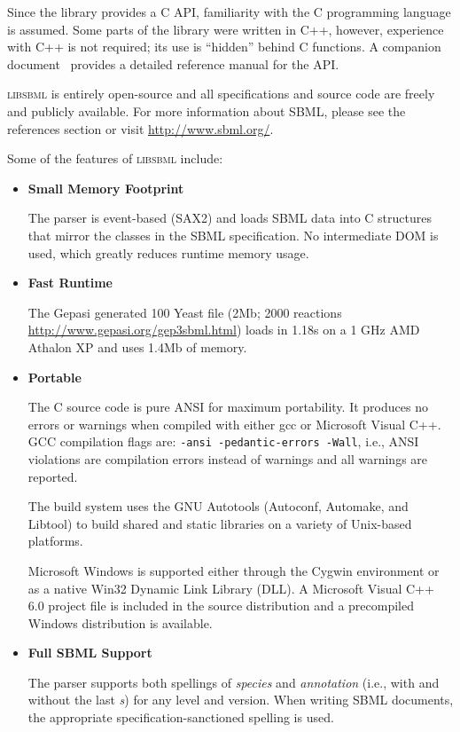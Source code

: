 \documentclass{cekmanual}
\newcommand{\libsbml}{\textsc{libsbml}}
\begin{document}
Since the library provides a C API, familiarity with the C programming
language is assumed.  Some parts of the library were written in C++,
however, experience with C++ is not required; its use is ``hidden''
behind C functions.  A companion document~\citep{bornstein:2003b} provides
a detailed reference manual for the API.

\libsbml{} is entirely open-source and all specifications and
source code are freely and publicly available.  For more information
about SBML, please see the references section or visit
\url{http://www.sbml.org/}.

Some of the features of \textsc{libsbml} include:


\begin{itemize}

  \item \textbf{Small Memory Footprint}

  The parser is event-based (SAX2) and loads SBML data into C
  structures that mirror the classes in the SBML specification.  No
  intermediate DOM is used, which greatly reduces runtime memory
  usage.

  \item \textbf{Fast Runtime}

  The Gepasi generated 100 Yeast file (2Mb; 2000 reactions
  \url{http://www.gepasi.org/gep3sbml.html}) loads in 1.18s on a 1 GHz
  AMD Athalon XP and uses 1.4Mb of memory.

  \item \textbf{Portable}

  The C source code is pure ANSI for maximum portability.  It produces
  no errors or warnings when compiled with either gcc or Microsoft
  Visual C++.  GCC compilation flags are: \texttt{-ansi
  -pedantic-errors -Wall}, i.e., ANSI violations are compilation errors
  instead of warnings and all warnings are reported.

  The build system uses the GNU Autotools (Autoconf, Automake, and
  Libtool) to build shared and static libraries on a variety of
  Unix-based platforms.

  Microsoft Windows is supported either through the Cygwin environment
  or as a native Win32 Dynamic Link Library (DLL).  A Microsoft Visual
  C++ 6.0 project file is included in the source distribution and a
  precompiled Windows distribution is available.

  \item \textbf{Full SBML Support}

  The parser supports both spellings of \emph{species} and
  \emph{annotation} (i.e., with and without the last \emph{s}) for any
  level and version.  When writing SBML documents, the appropriate
  specification-sanctioned spelling is used.


\end{itemize}
\end{document}
